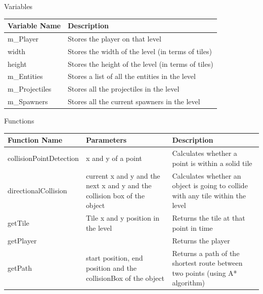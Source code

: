 \documentclass{article}
\begin{document}
                \begin{center}
                    Variables
                    \begin{tabular}{ | m{} | m{} | }
                        \hline
                        \textbf{Variable Name} & \textbf{Description} \\
                        \hline
                        m\_Player & Stores the player on that level \\
                        \hline
                        width & Stores the width of the level (in terms of tiles)\\
                        \hline
                        height & Stores the height of the level (in terms of tiles)\\
                        \hline
                        m\_Entities & Stores a list of all the entities in the level \\
                        \hline
                        m\_Projectiles & Stores all the projectiles in the level \\
                        \hline
                        m\_Spawners & Stores all the current spawners in the level \\
                        \hline
                    \end{tabular}
                    Functions
                    \begin{tabular}{ | m{} | m{}| m{} | }
                        \hline
                        \textbf{Function Name} & \textbf{Parameters} & \textbf{Description} \\
                        \hline
                        collisionPointDetection & x and y of a point & Calculates whether a point is within a solid tile \\
                        \hline
                        directionalCollision & current x and y and the next x and y and the collision box of the object & Calculates whether an object is going to collide with any tile within the level \\
                        \hline
                        getTile & Tile x and y position in the level & Returns the tile at that point in time \\
                        \hline
                        getPlayer & & Returns the player \\
                        \hline
                        getPath & start position, end position and the collisionBox of the object & Returns a path of the shortest route between two points (using A* algorithm)\\

\end{tabular}
\end{center}
\end{document}
